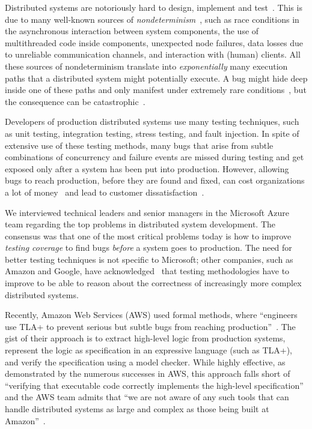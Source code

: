 Distributed systems are notoriously hard to design, implement and test~\cite{cavage2013there, laguna2015debugging, maddox2015test}. This is due to many well-known sources of \emph{nondeterminism}~\cite{chandra2007paxos}, such as race conditions in the asynchronous interaction between system components, the use of multithreaded code inside components, unexpected node failures, data losses due to unreliable communication channels, and interaction with (human) clients.
All these sources of nondeterminism translate into \emph{exponentially} many execution paths that a distributed system might potentially execute.
A bug might hide deep inside one of these paths and only manifest under extremely rare conditions~\cite{gray1986computers, musuvathi2008finding}, but the consequence can be catastrophic~\cite{amazon2012aws, google2014outage}.

Developers of production distributed systems use many testing techniques,
such as unit testing, integration testing, stress testing, and fault injection.
In spite of extensive use of these testing methods,
many bugs that arise from subtle combinations of concurrency and failure events
are missed during testing and get exposed only after a system has been put into production.
However, allowing bugs to reach production, before they are found and fixed, can cost organizations a lot of money~\cite{tassey2002economic} and lead to customer dissatisfaction~\cite{amazon2012aws, google2014outage}.

We interviewed technical leaders and senior managers in the Microsoft Azure team regarding the top problems in distributed system development.
The consensus was that one of the most critical problems today is how to improve \emph{testing coverage} to find bugs \emph{before} a system goes to production.
The need for better testing techniques is not specific to Microsoft;
other companies, such as Amazon and Google, have acknowledged~\cite{chandra2007paxos,newcombe2015aws} that testing methodologies have to improve to be able to reason about the correctness of increasingly more complex distributed systems.

Recently, Amazon Web Services (AWS) used formal methods, where ``engineers use TLA+ to prevent serious but subtle bugs from reaching production''~\cite{newcombe2015aws}. The gist of their approach is to extract high-level logic from production systems, represent the logic as specification in an expressive language (such as TLA+), and verify the specification using a model checker. While highly effective, as demonstrated by the numerous successes in AWS, this approach falls short of ``verifying that executable code correctly implements the high-level specification'' and the AWS team admits that ``we are not aware of any such tools that can handle distributed systems as large and complex as those being built at Amazon''~\cite{newcombe2015aws}.

